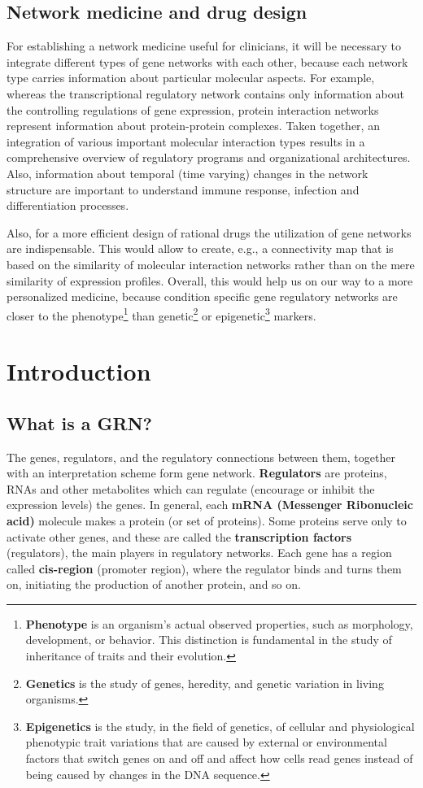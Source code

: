 \documentclass[oneside, a4paper, 11pt]{book}
\begin{document}
\section{Network medicine and drug design}
For establishing a network medicine useful for clinicians, it will be necessary to integrate different types of gene networks with each other, because each network type carries information about particular molecular aspects. For example, whereas the transcriptional regulatory network contains only information about the controlling regulations of gene expression, protein interaction networks represent information about protein-protein complexes. Taken together, an integration of various important molecular interaction types results in a comprehensive overview of regulatory programs and organizational architectures. Also, information about temporal (time varying) changes in the network structure are important to understand immune response, infection and differentiation processes.

Also, for a more efficient design of rational drugs the utilization of gene networks are indispensable. This would allow to create, e.g., a connectivity map that is based on the similarity of molecular interaction networks rather than on the mere similarity of expression profiles. Overall, this would help us on our way to a more personalized medicine, because condition specific gene regulatory networks are closer to the phenotype\footnote{\textbf{Phenotype} is an organism's actual observed properties, such as morphology, development, or behavior. This distinction is fundamental in the study of inheritance of traits and their evolution.} than genetic\footnote{\textbf{Genetics} is the study of genes, heredity, and genetic variation in living organisms.} or epigenetic\footnote{\textbf{Epigenetics} is the study, in the field of genetics, of cellular and physiological phenotypic trait variations that are caused by external or environmental factors that switch genes on and off and affect how cells read genes instead of being caused by changes in the DNA sequence.} markers.


\chapter{Introduction}
\markboth{}{}
\section{What is a GRN?}
The genes, regulators, and the regulatory connections between them, together with an interpretation scheme form gene network. \textbf{Regulators} are proteins, RNAs and other metabolites which can regulate (encourage or inhibit the expression levels) the genes. In general, each \textbf{mRNA (Messenger Ribonucleic acid)} molecule makes a protein (or set of proteins). Some proteins serve only to activate other genes, and these are called the \textbf{transcription factors} (regulators), the main players in regulatory networks. Each gene has a region called \textbf{cis-region} (promoter region), where the regulator binds and turns them on, initiating the production of another protein, and so on\cite{streib}.
\end{document}
